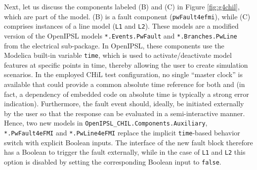 Next, let us discuss the components labeled (B) and (C) in Figure \ref{fig:g4chil}, which are part of the \plant{} model. (B) is a fault component (\texttt{pwFault4efmi}), while (C) comprises instances of a line model (\texttt{L1} and \texttt{L2}). These models are a modified version of the OpenIPSL models \texttt{*.Events.PwFault} and \texttt{*.Branches.PwLine} from the electrical sub-package. In OpenIPSL, these components use the Modelica built-in variable \texttt{time}, which is used to activate/deactivate model features at specific points in time, thereby allowing the user to create simulation scenarios. In the employed CHiL test configuration, no single “master clock” is available that could provide a common absolute time reference for both \controller{} and \plant{} (in fact, a dependency of embedded code on absolute time is typically a strong error indication). Furthermore, the fault event should, ideally, be initiated externally by the user so that the \controller{} response can be evaluated in a semi-interactive manner. Hence, two new models in \texttt{OpenIPSL\_CHIL.Components.Auxiliary}, \texttt{*.PwFault4eFMI} and \texttt{*.PwLine4eFMI} replace the implicit \texttt{\texttt{time}}-based behavior switch with explicit Boolean inputs. The interface of the new fault block therefore has a Boolean to trigger the fault externally, while in the case of \texttt{L1} and \texttt{L2} this option is disabled by setting the corresponding Boolean input to \texttt{false}.


